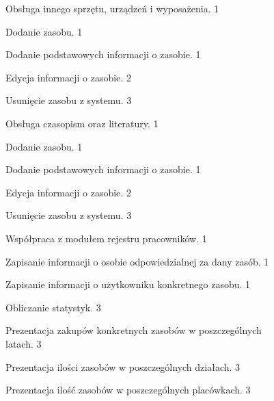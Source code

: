 \begin{myEnumerate}
\begin{myEnumerate}
\begin{myEnumerate}
	\item\label{f17} Obsługa innego sprzętu, urządzeń i wyposażenia. 
	\hfill 1
	\begin{myEnumerate}
		\item\label{f18} Dodanie zasobu. 
		\hfill 1
		\begin{myEnumerate}
			\item\label{f19} Dodanie podstawowych informacji o zasobie. 
			\hfill 1
		\end{myEnumerate}
		\item\label{f20} Edycja informacji o zasobie. 
		\hfill 2
		\item\label{f21} Usunięcie zasobu z systemu. 
		\hfill 3
	\end{myEnumerate}

	\item\label{f22} Obsługa czasopism oraz literatury. 
	\hfill 1
	\begin{myEnumerate}
		\item\label{f23} Dodanie zasobu. 
		\hfill 1
		\begin{myEnumerate}
			\item\label{f24} Dodanie podstawowych informacji o zasobie. 
			\hfill 1
		\end{myEnumerate}
		\item\label{f25} Edycja informacji o zasobie. 
		\hfill 2
		\item\label{f26} Usunięcie zasobu z systemu. 
		\hfill 3
	\end{myEnumerate}

	\end{myEnumerate}

	\item\label{f27} Współpraca z modułem rejestru pracowników. 
	\hfill 1
	\begin{myEnumerate}
	\item\label{f28} Zapisanie informacji o osobie odpowiedzialnej za dany zasób. 
	\hfill 1
	\item\label{f29} Zapisanie informacji o użytkowniku konkretnego
	 zasobu. 
	 \hfill 1
	\end{myEnumerate}

	\item\label{f30} Obliczanie statystyk. 
	\hfill 3
	\begin{myEnumerate}
	\item\label{f31} Prezentacja zakupów konkretnych zasobów w poszczególnych \\ latach. 
	\hfill 3
	\item\label{f32} Prezentacja ilości zasobów w poszczególnych działach. 
	\hfill 3
	\item\label{f33} Prezentacja ilość zasobów w poszczególnych placówkach. 
	\hfill 3
	\end{myEnumerate}
	\end{myEnumerate}



\end{myEnumerate}
